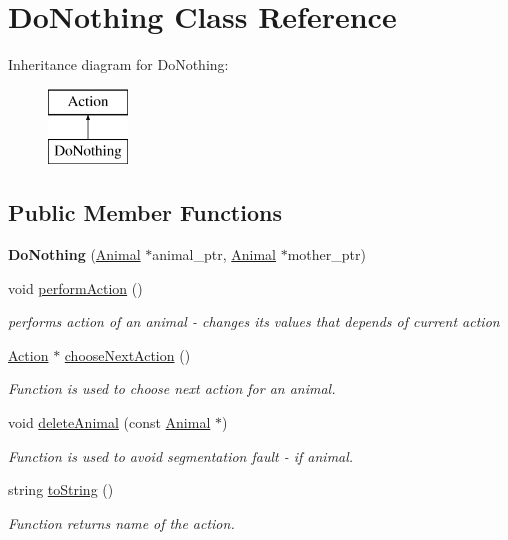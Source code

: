 \hypertarget{class_do_nothing}{}\section{Do\+Nothing Class Reference}
\label{class_do_nothing}
Inheritance diagram for Do\+Nothing\+:\begin{figure}[H]
\begin{center}
\leavevmode
\includegraphics[height=2.000000cm]{class_do_nothing}
\end{center}
\end{figure}
\subsection*{Public Member Functions}
\begin{DoxyCompactItemize}
\item 
\hypertarget{class_do_nothing_a07c31cc665631fbb7297c340ee37127e}{}{\bfseries Do\+Nothing} (\hyperlink{class_animal}{Animal} $\ast$animal\+\_\+ptr, \hyperlink{class_animal}{Animal} $\ast$mother\+\_\+ptr)\label{class_do_nothing_a07c31cc665631fbb7297c340ee37127e}

\item 
void \hyperlink{class_do_nothing_a62278199ca50f424ec0de4558ba7efa9}{perform\+Action} ()
\begin{DoxyCompactList}\small\item\em performs action of an animal -\/ changes it\textquotesingle{}s values that depends of current action \end{DoxyCompactList}\item 
\hyperlink{class_action}{Action} $\ast$ \hyperlink{class_do_nothing_af829f1fc1893c5f9c31e8632c4dbe2cc}{choose\+Next\+Action} ()
\begin{DoxyCompactList}\small\item\em Function is used to choose next action for an animal. \end{DoxyCompactList}\item 
void \hyperlink{class_do_nothing_ae01160976750e98bf22bc34f773ea264}{delete\+Animal} (const \hyperlink{class_animal}{Animal} $\ast$)
\begin{DoxyCompactList}\small\item\em Function is used to avoid segmentation fault -\/ if animal. \end{DoxyCompactList}\item 
string \hyperlink{class_do_nothing_ab9e24b3640d4e8125cba091df9d16e7b}{to\+String} ()
\begin{DoxyCompactList}\small\item\em Function returns name of the action. \end{DoxyCompactList}\end{DoxyCompactItemize}
